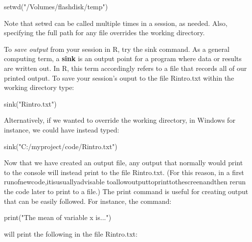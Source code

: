 \documentclass[
]{book}
\newenvironment{Shaded}{\begin{snugshade}}{\end{snugshade}}
\newcommand{\FunctionTok}[1]{\textcolor[rgb]{0.00,0.00,0.00}{#1}}
\newcommand{\NormalTok}[1]{#1}
\newcommand{\StringTok}[1]{\textcolor[rgb]{0.31,0.60,0.02}{#1}}
\begin{document}
\begin{Shaded}
\begin{Highlighting}[]
\FunctionTok{setwd}\NormalTok{(}\StringTok{"/Volumes/flashdisk/temp"}\NormalTok{)}
\end{Highlighting}
\end{Shaded}

Note that setwd can be called multiple times in a session, as needed. Also, specifying the full path for any file overrides the working directory.

To \emph{save output} from your session in R, try the sink command. As a general computing term, a \textbf{sink} is an output point for a program where data or results are written out. In R, this term accordingly refers to a file that records all of our printed output. To save your session's ouput to the file Rintro.txt within the working directory type:

\begin{Shaded}
\begin{Highlighting}[]
\FunctionTok{sink}\NormalTok{(}\StringTok{"Rintro.txt"}\NormalTok{)}
\end{Highlighting}
\end{Shaded}

Alternatively, if we wanted to override the working directory, in Windows for instance, we could have instead typed:

\begin{Shaded}
\begin{Highlighting}[]
\FunctionTok{sink}\NormalTok{(}\StringTok{"C:/myproject/code/Rintro.txt"}\NormalTok{)}
\end{Highlighting}
\end{Shaded}

Now that we have created an output file, any output that normally would print to the console will instead print to the file Rintro.txt. (For this reason, in a first runofnewcode,itisusuallyadvisable toallowoutputtoprinttothescreenandthen rerun the code later to print to a file.) The print command is useful for creating output that can be easily followed. For instance, the command:

\begin{Shaded}
\begin{Highlighting}[]
\FunctionTok{print}\NormalTok{(}\StringTok{"The mean of variable x is..."}\NormalTok{)}
\end{Highlighting}
\end{Shaded}

will print the following in the file Rintro.txt:
\end{document}
